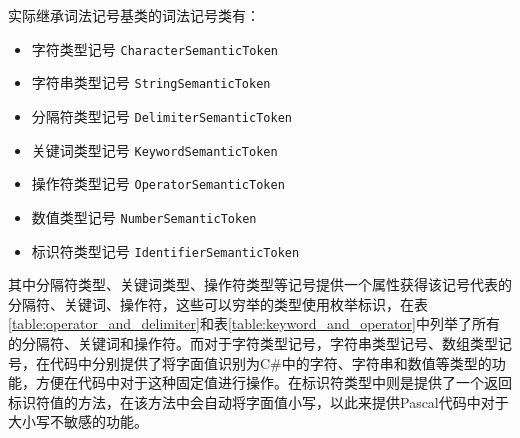 \documentclass[../main.tex]{subfiles}
\begin{document}
实际继承词法记号基类的词法记号类有：
\begin{itemize}
\item 字符类型记号 \texttt{CharacterSemanticToken}
\item 字符串类型记号 \texttt{StringSemanticToken}
\item 分隔符类型记号 \texttt{DelimiterSemanticToken}
\item 关键词类型记号 \texttt{KeywordSemanticToken}
\item 操作符类型记号 \texttt{OperatorSemanticToken}
\item 数值类型记号 \texttt{NumberSemanticToken}
\item 标识符类型记号 \texttt{IdentifierSemanticToken}
\end{itemize}

其中分隔符类型、关键词类型、操作符类型等记号提供一个属性获得该记号代表的分隔符、关键词、操作符，这些可以穷举的类型使用枚举标识，在表\ref{table:operator_and_delimiter}和表\ref{table:keyword_and_operator}中列举了所有的分隔符、关键词和操作符。而对于字符类型记号，字符串类型记号、数组类型记号，在代码中分别提供了将字面值识别为C\#中的字符、字符串和数值等类型的功能，方便在代码中对于这种固定值进行操作。在标识符类型中则是提供了一个返回标识符值的方法，在该方法中会自动将字面值小写，以此来提供Pascal代码中对于大小写不敏感的功能。

\end{document}
